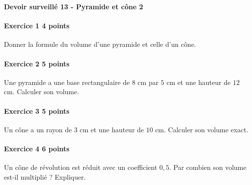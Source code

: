 \documentclass[a4paper,10pt]{article}
\newenvironment{exercice}[2]{\paragraph{Exercice #1 \hfill #2 points}\mbox{}\par}{\medskip}
\begin{document}
\begin{center}\Large\bfseries Devoir surveillé 13 - Pyramide et cône 2\end{center}
\vspace{2mm}
\begin{exercice}{1}{4}Donner la formule du volume d'une pyramide et celle d'un cône.\end{exercice}\begin{exercice}{2}{5}Une pyramide a une base rectangulaire de $8$ cm par $5$ cm et une hauteur de $12$ cm. Calculer son volume.\end{exercice}\begin{exercice}{3}{5}Un cône a un rayon de $3$ cm et une hauteur de $10$ cm. Calculer son volume exact.\end{exercice}\begin{exercice}{4}{6}Un cône de révolution est réduit avec un coefficient $0,5$. Par combien son volume est-il multiplié ? Expliquer.\end{exercice}
\end{document}
